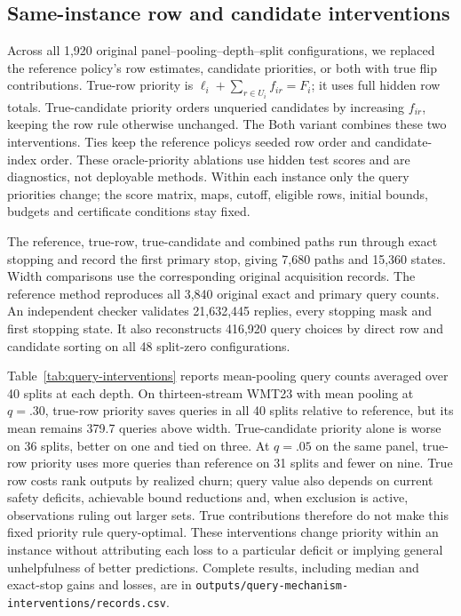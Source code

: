 \subsection{Same-instance row and candidate interventions}
\label{app:query-interventions}
Across all 1,920 original panel--pooling--depth--split configurations, we replaced the reference policy's row estimates, candidate priorities, or both with true flip contributions. True-row priority is $\ell_i+\sum_{r\in U_i}f_{ir}=F_i$; it uses full hidden row totals. True-candidate priority orders unqueried candidates by increasing $f_{ir}$, keeping the row rule otherwise unchanged. The Both variant combines these two interventions. Ties keep the reference policy\textquotesingle s seeded row order and candidate-index order. These oracle-priority ablations use hidden test scores and are diagnostics, not deployable methods. Within each instance only the query priorities change; the score matrix, maps, cutoff, eligible rows, initial bounds, budgets and certificate conditions stay fixed.

The reference, true-row, true-candidate and combined paths run through exact stopping and record the first primary stop, giving 7,680 paths and 15,360 states. Width comparisons use the corresponding original acquisition records. The reference method reproduces all 3,840 original exact and primary query counts. An independent checker validates 21,632,445 replies, every stopping mask and first stopping state. It also reconstructs 416,920 query choices by direct row and candidate sorting on all 48 split-zero configurations.

Table~\ref{tab:query-interventions} reports mean-pooling query counts averaged over 40 splits at each depth. On thirteen-stream WMT23 with mean pooling at $q=.30$, true-row priority saves queries in all 40 splits relative to reference, but its mean remains 379.7 queries above width. True-candidate priority alone is worse on 36 splits, better on one and tied on three. At $q=.05$ on the same panel, true-row priority uses more queries than reference on 31 splits and fewer on nine. True row costs rank outputs by realized churn; query value also depends on current safety deficits, achievable bound reductions and, when exclusion is active, observations ruling out larger sets. True contributions therefore do not make this fixed priority rule query-optimal. These interventions change priority within an instance without attributing each loss to a particular deficit or implying general unhelpfulness of better predictions. Complete results, including median and exact-stop gains and losses, are in \nolinkurl{outputs/query-mechanism-interventions/records.csv}.


